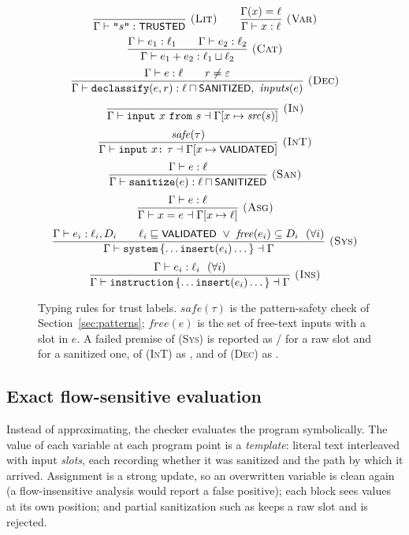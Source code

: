 \documentclass[conference]{IEEEtran}
\begin{document}
\begin{figure}[t]
\centering\footnotesize
\[
\frac{}{\Gamma \vdash \texttt{"}s\texttt{"} : \textsf{\small TRUSTED}}\ \textsc{(Lit)}
\qquad
\frac{\Gamma(x) = \ell}{\Gamma \vdash x : \ell}\ \textsc{(Var)}
\]
\[
\frac{\Gamma \vdash e_1 : \ell_1 \qquad \Gamma \vdash e_2 : \ell_2}{\Gamma \vdash e_1 + e_2 : \ell_1 \sqcup \ell_2}\ \textsc{(Cat)}
\]
\[
\frac{\Gamma \vdash e : \ell \qquad r \neq \varepsilon}{\Gamma \vdash \texttt{declassify}(e, r) : \ell \sqcap \textsf{\small SANITIZED},\ \mathit{inputs}(e)}\ \textsc{(Dec)}
\]
\[
\frac{}{\Gamma \vdash \code{input}\ x\ \code{from}\ s \dashv \Gamma[x \mapsto \mathit{src}(s)]}\ \textsc{(In)}
\]
\[
\frac{\mathit{safe}(\tau)}{\Gamma \vdash \texttt{input}\ x \texttt{:}\ \tau \dashv \Gamma[x \mapsto \textsf{\small VALIDATED}]}\ \textsc{(InT)}
\]
\[
\frac{\Gamma \vdash e : \ell}{\Gamma \vdash \code{sanitize}(e) : \ell \sqcap \lab{SANITIZED}}\ \textsc{(San)}
\]
\[
\frac{\Gamma \vdash e : \ell}{\Gamma \vdash x = e \dashv \Gamma[x \mapsto \ell]}\ \textsc{(Asg)}
\]
\[
\frac{\Gamma \vdash e_i : \ell_i, D_i \qquad \ell_i \sqsubseteq \lab{VALIDATED} \ \vee\ \mathit{free}(e_i) \subseteq D_i\ \ (\forall i)}{\Gamma \vdash \code{system}\,\{\dots \code{insert}(e_i) \dots\} \dashv \Gamma}\ \textsc{(Sys)}
\]
\[
\frac{\Gamma \vdash e_i : \ell_i\ \ (\forall i)}{\Gamma \vdash \texttt{instruction}\,\{\dots \texttt{insert}(e_i) \dots\} \dashv \Gamma}\ \textsc{(Ins)}
\]
\caption{Typing rules for trust labels. $\mathit{safe}(\tau)$ is the pattern-safety check of Section~\ref{sec:patterns}; $\mathit{free}(e)$ is the set of free-text inputs with a slot in $e$. A failed premise of (\textsc{Sys}) is reported as / for a raw slot and  for a sanitized one, of (\textsc{InT}) as , and of (\textsc{Dec}) as .}
\label{fig:rules}
\end{figure}

\subsection{Exact flow-sensitive evaluation}
Instead of approximating, the checker evaluates the program symbolically. The value of each variable at each program point is a \emph{template}: literal text interleaved with input \emph{slots}, each recording whether it was sanitized and the path by which it arrived. Assignment is a strong update, so an overwritten variable is clean again (a flow-insensitive analysis would report a false positive); each block sees values at its own position; and partial sanitization such as  keeps a raw slot and is rejected.
\end{document}
